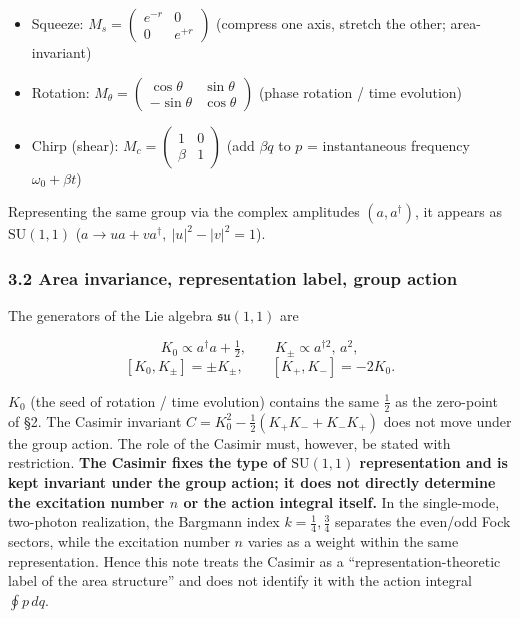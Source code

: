 \documentclass[
]{article}
\providecommand{\tightlist}{%
  \setlength{\itemsep}{0pt}\setlength{\parskip}{0pt}}
\begin{document}
\begin{itemize}
\tightlist
\item
  Squeeze: \(M_s=\begin{pmatrix}e^{-r}&0\\0&e^{+r}\end{pmatrix}\)
  (compress one axis, stretch the other; area-invariant)
\item
  Rotation:
  \(M_\theta=\begin{pmatrix}\cos\theta&\sin\theta\\-\sin\theta&\cos\theta\end{pmatrix}\)
  (phase rotation / time evolution)
\item
  Chirp (shear): \(M_c=\begin{pmatrix}1&0\\ \beta&1\end{pmatrix}\) (add
  \(\beta q\) to \(p\) = instantaneous frequency \(\omega_0+\beta t\))
\end{itemize}

Representing the same group via the complex amplitudes
\((a,a^\dagger)\), it appears as \(\mathrm{SU}(1,1)\)
(\(a\to ua+va^\dagger,\ |u|^2-|v|^2=1\)).

\subsubsection{3.2 Area invariance, representation label, group
action}\label{area-invariance-representation-label-group-action}

The generators of the Lie algebra \(\mathfrak{su}(1,1)\) are

\[K_0\propto a^\dagger a+\tfrac12,\qquad K_\pm\propto a^{\dagger 2},\,a^2,\]
\[[K_0,K_\pm]=\pm K_\pm,\qquad [K_+,K_-]=-2K_0.\]

\(K_0\) (the seed of rotation / time evolution) contains the same
\(\tfrac12\) as the zero-point of §2. The Casimir invariant
\(C=K_0^2-\tfrac12(K_+K_-+K_-K_+)\) does not move under the group
action. The role of the Casimir must, however, be stated with
restriction. \textbf{The Casimir fixes the type of \(\mathrm{SU}(1,1)\)
representation and is kept invariant under the group action; it does not
directly determine the excitation number \(n\) or the action integral
itself.} In the single-mode, two-photon realization, the Bargmann index
\(k=\tfrac14,\tfrac34\) separates the even/odd Fock sectors, while the
excitation number \(n\) varies as a weight within the same
representation. Hence this note treats the Casimir as a
``representation-theoretic label of the area structure'' and does not
identify it with the action integral \(\oint p\,dq\).
\end{document}
